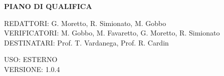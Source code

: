 \documentclass[5pt]{article}
\begin{document}
	\vspace{24pt}
	
	\begin{center}
		\textbf{\LARGE PIANO DI QUALIFICA}
	\end{center}
	
	\vspace{13pt}
	
	\begin{flushleft}
		\begin{spacing}{1.5}
			REDATTORI: G. Moretto, R. Simionato, M. Gobbo\\%
			VERIFICATORI: M. Gobbo, M. Favaretto, G. Moretto, R. Simionato\\
			\vspace{7pt}
			DESTINATARI: Prof. T. Vardanega, Prof. R. Cardin\\%
		\end{spacing}
	\end{flushleft}
	
	\begin{flushright}
		\begin{spacing}{1}
			USO: ESTERNO\\
			VERSIONE: 1.0.4\\
		\end{spacing}
	\end{flushright}
	
	
	\restoregeometry
	
	\pagebreak
	
\end{document}
